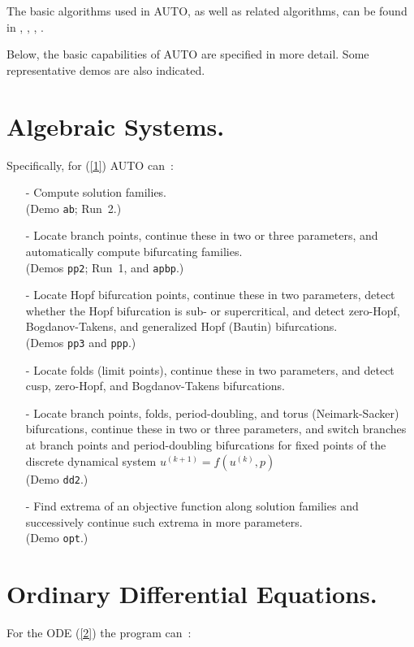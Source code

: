 \documentclass[12pt]{report}
\begin{document}
The basic algorithms used in {\cal AUTO},
as well as related algorithms, can be found in 
 \citeyear{HBK:77},
 \citeyear{HBK:86},
 \citeyear{DoKeKe:91a},
 \citeyear{DoKeKe:91b}.

Below, the basic capabilities of {\cal AUTO} are specified in more detail.
Some representative demos are also indicated.
 
\section{ Algebraic Systems.} \label{sec:algebraic_systems}
Specifically, for (\ref{1}) {\cal AUTO} can~:~
 
\begin{itemize}
\item[-]
  Compute solution families.\\  (Demo {\tt ab}; Run~2.) 
\item[-]
  Locate branch points, continue these in two or three parameters,
  and automatically compute
  bifurcating families. \\ (Demos {\tt pp2}; Run~1, and {\tt apbp}.)
\item[-]
  Locate Hopf bifurcation points, continue these in two
  parameters, detect whether the Hopf bifurcation is sub- or
  supercritical, and detect zero-Hopf, Bogdanov-Takens, and 
  generalized Hopf (Bautin) bifurcations.\\ (Demos {\tt pp3} and
  {\tt ppp}.)
\item[-]
  Locate folds (limit points), continue these 
  in two parameters, and detect cusp, zero-Hopf, and Bogdanov-Takens
  bifurcations. \\
\item[-]
  Locate branch points, folds, period-doubling, and torus
  (Neimark-Sacker) bifurcations, continue these in two or three
  parameters, and switch branches at branch points and
  period-doubling bifurcations
  for fixed points of the discrete dynamical system
  $u^{(k+1)}= f( u^{(k)}, p )$ \\ (Demo {\tt dd2}.)
\item[-]
  Find extrema of an objective function along solution families
  and successively continue such extrema in more parameters.
  \\ (Demo {\tt opt}.)
\end{itemize}


\section{ Ordinary Differential Equations.} \label{sec:ODEs}
For the ODE (\ref{2}) the program can~:~
 
\end{document}
